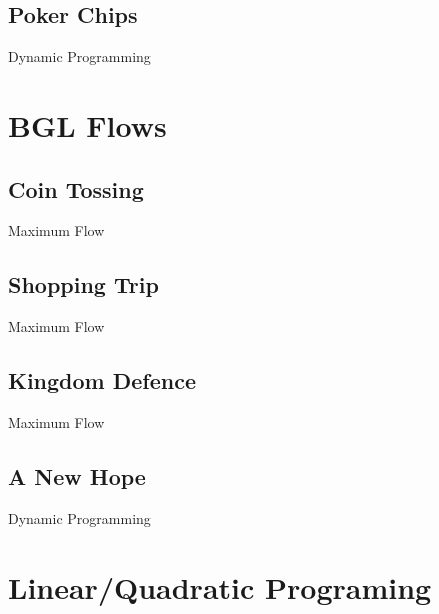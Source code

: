 \documentclass[10pt,a4paper,twoside]{report}
\begin{document}
\newpage
\subsection*{Poker Chips}
\begin{keywords}Dynamic Programming\end{keywords}



\newpage
\section{BGL Flows}

\subsection*{Coin Tossing}
\begin{keywords}Maximum Flow\end{keywords}


\newpage
\subsection*{Shopping Trip}
\begin{keywords}Maximum Flow\end{keywords}


\newpage
\subsection*{Kingdom Defence}
\begin{keywords}Maximum Flow\end{keywords}


\newpage
\subsection*{A New Hope}
\begin{keywords}Dynamic Programming\end{keywords}



\newpage
\section{Linear/Quadratic Programing}
\end{document}
